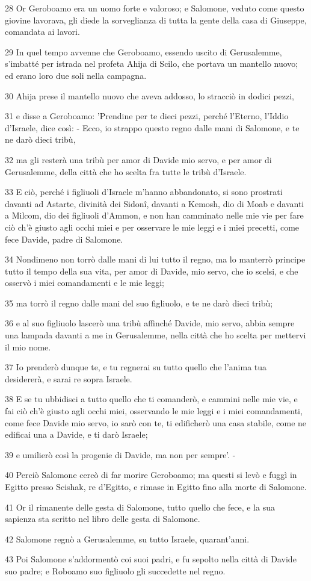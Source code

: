 \par 28 Or Geroboamo era un uomo forte e valoroso; e Salomone, veduto come questo giovine lavorava, gli diede la sorveglianza di tutta la gente della casa di Giuseppe, comandata ai lavori.
\par 29 In quel tempo avvenne che Geroboamo, essendo uscito di Gerusalemme, s'imbatté per istrada nel profeta Ahija di Scilo, che portava un mantello nuovo; ed erano loro due soli nella campagna.
\par 30 Ahija prese il mantello nuovo che aveva addosso, lo stracciò in dodici pezzi,
\par 31 e disse a Geroboamo: 'Prendine per te dieci pezzi, perché l'Eterno, l'Iddio d'Israele, dice così: - Ecco, io strappo questo regno dalle mani di Salomone, e te ne darò dieci tribù,
\par 32 ma gli resterà una tribù per amor di Davide mio servo, e per amor di Gerusalemme, della città che ho scelta fra tutte le tribù d'Israele.
\par 33 E ciò, perché i figliuoli d'Israele m'hanno abbandonato, si sono prostrati davanti ad Astarte, divinità dei Sidonî, davanti a Kemosh, dio di Moab e davanti a Milcom, dio dei figliuoli d'Ammon, e non han camminato nelle mie vie per fare ciò ch'è giusto agli occhi miei e per osservare le mie leggi e i miei precetti, come fece Davide, padre di Salomone.
\par 34 Nondimeno non torrò dalle mani di lui tutto il regno, ma lo manterrò principe tutto il tempo della sua vita, per amor di Davide, mio servo, che io scelsi, e che osservò i miei comandamenti e le mie leggi;
\par 35 ma torrò il regno dalle mani del suo figliuolo, e te ne darò dieci tribù;
\par 36 e al suo figliuolo lascerò una tribù affinché Davide, mio servo, abbia sempre una lampada davanti a me in Gerusalemme, nella città che ho scelta per mettervi il mio nome.
\par 37 Io prenderò dunque te, e tu regnerai su tutto quello che l'anima tua desidererà, e sarai re sopra Israele.
\par 38 E se tu ubbidisci a tutto quello che ti comanderò, e cammini nelle mie vie, e fai ciò ch'è giusto agli occhi miei, osservando le mie leggi e i miei comandamenti, come fece Davide mio servo, io sarò con te, ti edificherò una casa stabile, come ne edificai una a Davide, e ti darò Israele;
\par 39 e umilierò così la progenie di Davide, ma non per sempre'. -
\par 40 Perciò Salomone cercò di far morire Geroboamo; ma questi si levò e fuggì in Egitto presso Scishak, re d'Egitto, e rimase in Egitto fino alla morte di Salomone.
\par 41 Or il rimanente delle gesta di Salomone, tutto quello che fece, e la sua sapienza sta scritto nel libro delle gesta di Salomone.
\par 42 Salomone regnò a Gerusalemme, su tutto Israele, quarant'anni.
\par 43 Poi Salomone s'addormentò coi suoi padri, e fu sepolto nella città di Davide suo padre; e Roboamo suo figliuolo gli succedette nel regno.

